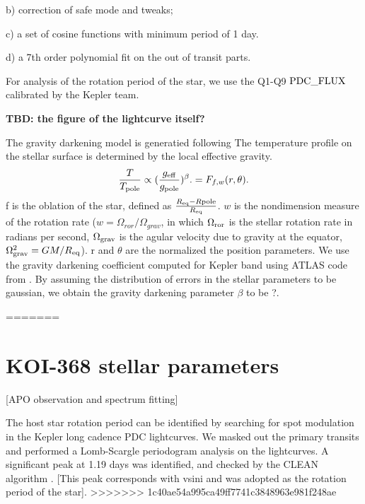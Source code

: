 \documentclass[preprint]{emulateapj}
\begin{document}
b) correction of safe mode and tweaks;

c) a set of cosine functions with minimum period of 1 day. 

d) a 7th order polynomial fit on the out of transit parts. 

For analysis of the rotation period of the star, we use the Q1-Q9 
$\rm PDC\_FLUX$ \citep{Smith:2012} calibrated by the Kepler team. 

{\bf TBD: the figure of the lightcurve itself?}


The gravity darkening model is generatied following 
\citet{Barnes:2009}
The temperature profile on the stellar surface is determined by the local 
effective gravity.
\begin{equation}
\frac{T}{T_{\rm pole}} \propto (\frac{g_{\rm eff}}{g_{\rm pole}})^{\beta}. 
= F_{f,w} (r,\theta).
\end{equation}
f is the oblation of the star, defined as 
$\frac{R_{\rm eq}-R{\rm pole}}{R_{\rm eq}}$. $w$ is the nondimension 
measure of the rotation rate ($w=\Omega_{ror}/\Omega_{grav}$, in which 
$\Omega_{\rm ror}$ is the stellar rotation rate in radians per second, 
$\Omega_{\rm grav}$ is the agular velocity due to gravity at the equator, 
$\Omega_{\rm grav}^2 = GM/R_{\rm eq}$). r and $\theta$ are the normalized 
the position parameters. We use the gravity darkening coefficient computed 
for Kepler band using ATLAS code from \citet{Claret:2011}. By assuming the 
distribution of errors in the stellar parameters to be gaussian, we obtain 
the gravity darkening parameter $\beta$ to be ?.

=======

\section{KOI-368 stellar parameters}
\label{sec:host-star-parameters}

[APO observation and spectrum fitting]

The host star rotation period can be identified by searching for spot
modulation in the Kepler long cadence PDC lightcurves. We masked out
the primary transits and performed a Lomb-Scargle periodogram \citep[][]{Lomb1976,Scargle1982} analysis
on the lightcurves. A significant peak at 1.19 days was identified,
and checked by the CLEAN algorithm \citep{Roberts1987}. [This peak corresponds with vsini
and was adopted as the rotation period of the star].
>>>>>>> 1c40ae54a995ca49ff7741c3848963e981f248ae
\end{document}

